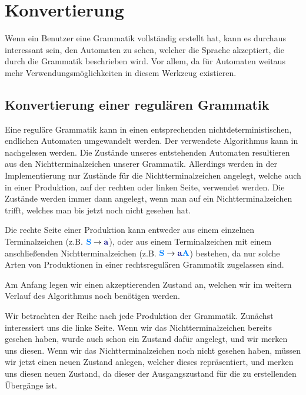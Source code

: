 \section{Konvertierung}\label{ConverToGrammar}

Wenn ein Benutzer eine Grammatik vollständig erstellt hat, kann es durchaus
interessant sein, den Automaten zu sehen, welcher die Sprache akzeptiert, die
durch die Grammatik beschrieben wird. Vor allem, da für Automaten weitaus mehr
Verwendungsmöglichkeiten in diesem Werkzeug existieren.\vspace{10pt}


\subsection{Konvertierung einer regulären Grammatik}\label{ConverToGrammarRegular}

Eine reguläre Grammatik kann in einen entsprechenden nichtdeterministischen,
endlichen Automaten umgewandelt werden. Der verwendete Algorithmus kann in
\cite{Compilers} nachgelesen werden. Die Zustände unseres entstehenden Automaten
resultieren aus den Nichtterminalzeichen unserer Grammatik. Allerdings werden in
der Implementierung nur Zustände für die Nichtterminalzeichen angelegt, welche
auch in einer Produktion, auf der rechten oder linken Seite, verwendet werden.
Die Zustände werden immer dann angelegt, wenn man auf ein Nichtterminalzeichen
trifft, welches man bis jetzt noch nicht gesehen hat.\vspace{10pt}

Die rechte Seite einer Produktion kann entweder aus einem einzelnen
Terminalzeichen (z.B. $\NonterminalSymbol{S} \to \TerminalSymbol{a}$), oder
aus einem Terminalzeichen mit einem anschließenden Nichtterminalzeichen
(z.B. $\NonterminalSymbol{S} \to \TerminalSymbol{a}\NonterminalSymbol{A}$)
bestehen, da nur solche Arten von Produktionen in einer rechtsregulären
Grammatik zugelassen sind.\vspace{10pt}

Am Anfang legen wir einen akzeptierenden Zustand an, welchen wir im weitern
Verlauf des Algorithmus noch benötigen werden.\vspace{10pt}

 Wir betrachten der Reihe nach
jede Produktion der Grammatik. Zunächst interessiert uns die linke Seite. Wenn wir das Nichtterminalzeichen
bereits gesehen haben, wurde auch schon ein Zustand dafür angelegt, und wir
merken uns diesen. Wenn wir das Nichtterminalzeichen noch nicht gesehen haben,
müssen wir jetzt einen neuen Zustand anlegen, welcher dieses repräsentiert, und
merken uns diesen neuen Zustand, da dieser der Ausgangszustand
für die zu erstellenden Übergänge ist.\vspace{10pt}

